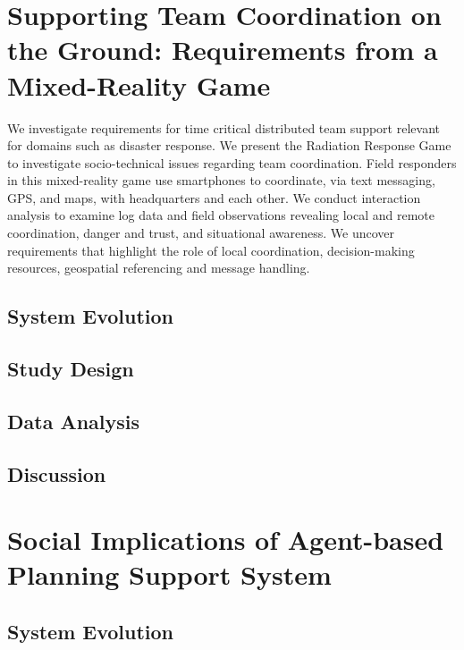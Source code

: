 \chapter{Supporting Team Coordination on the Ground: Requirements from a Mixed-Reality Game}\label{ch:mathtest} %
We investigate requirements for time critical distributed team support relevant for domains such as disaster response. We present the Radiation Response Game to investigate socio-technical issues regarding team coordination. Field responders in this mixed-reality game use smartphones to coordinate, via text messaging, GPS, and maps, with headquarters and each other. We conduct interaction analysis to examine log data and field observations revealing local and remote coordination, danger and trust, and situational awareness. We uncover requirements that highlight the role of local coordination, decision-making resources, geospatial referencing and message handling. 

\section{System Evolution}

\section{Study Design}

\section{Data Analysis}

\section{Discussion}

\chapter{Social Implications of Agent-based Planning Support System}\label{ch:mathtest} %

\section{System Evolution}


